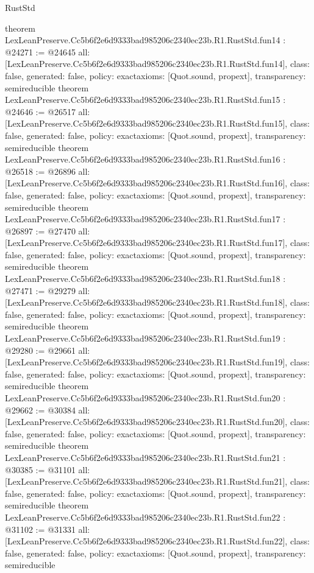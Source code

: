 \begin{lexlean}{RustStd}
\begin{coremodule}
{}
theorem LexLeanPreserve.Cc5b6f2e6d9333bad985206c2340ec23b.R1.RustStd.fun14 : @24271 := @24645 {
  all: [LexLeanPreserve.Cc5b6f2e6d9333bad985206c2340ec23b.R1.RustStd.fun14],
  class: false,
  generated: false,
  policy: exact{axioms: [Quot.sound, propext]},
  transparency: semireducible
}
theorem LexLeanPreserve.Cc5b6f2e6d9333bad985206c2340ec23b.R1.RustStd.fun15 : @24646 := @26517 {
  all: [LexLeanPreserve.Cc5b6f2e6d9333bad985206c2340ec23b.R1.RustStd.fun15],
  class: false,
  generated: false,
  policy: exact{axioms: [Quot.sound, propext]},
  transparency: semireducible
}
theorem LexLeanPreserve.Cc5b6f2e6d9333bad985206c2340ec23b.R1.RustStd.fun16 : @26518 := @26896 {
  all: [LexLeanPreserve.Cc5b6f2e6d9333bad985206c2340ec23b.R1.RustStd.fun16],
  class: false,
  generated: false,
  policy: exact{axioms: [Quot.sound, propext]},
  transparency: semireducible
}
theorem LexLeanPreserve.Cc5b6f2e6d9333bad985206c2340ec23b.R1.RustStd.fun17 : @26897 := @27470 {
  all: [LexLeanPreserve.Cc5b6f2e6d9333bad985206c2340ec23b.R1.RustStd.fun17],
  class: false,
  generated: false,
  policy: exact{axioms: [Quot.sound, propext]},
  transparency: semireducible
}
theorem LexLeanPreserve.Cc5b6f2e6d9333bad985206c2340ec23b.R1.RustStd.fun18 : @27471 := @29279 {
  all: [LexLeanPreserve.Cc5b6f2e6d9333bad985206c2340ec23b.R1.RustStd.fun18],
  class: false,
  generated: false,
  policy: exact{axioms: [Quot.sound, propext]},
  transparency: semireducible
}
theorem LexLeanPreserve.Cc5b6f2e6d9333bad985206c2340ec23b.R1.RustStd.fun19 : @29280 := @29661 {
  all: [LexLeanPreserve.Cc5b6f2e6d9333bad985206c2340ec23b.R1.RustStd.fun19],
  class: false,
  generated: false,
  policy: exact{axioms: [Quot.sound, propext]},
  transparency: semireducible
}
theorem LexLeanPreserve.Cc5b6f2e6d9333bad985206c2340ec23b.R1.RustStd.fun20 : @29662 := @30384 {
  all: [LexLeanPreserve.Cc5b6f2e6d9333bad985206c2340ec23b.R1.RustStd.fun20],
  class: false,
  generated: false,
  policy: exact{axioms: [Quot.sound, propext]},
  transparency: semireducible
}
theorem LexLeanPreserve.Cc5b6f2e6d9333bad985206c2340ec23b.R1.RustStd.fun21 : @30385 := @31101 {
  all: [LexLeanPreserve.Cc5b6f2e6d9333bad985206c2340ec23b.R1.RustStd.fun21],
  class: false,
  generated: false,
  policy: exact{axioms: [Quot.sound, propext]},
  transparency: semireducible
}
theorem LexLeanPreserve.Cc5b6f2e6d9333bad985206c2340ec23b.R1.RustStd.fun22 : @31102 := @31331 {
  all: [LexLeanPreserve.Cc5b6f2e6d9333bad985206c2340ec23b.R1.RustStd.fun22],
  class: false,
  generated: false,
  policy: exact{axioms: [Quot.sound, propext]},
  transparency: semireducible
}
\end{coremodule}
\end{lexlean}
